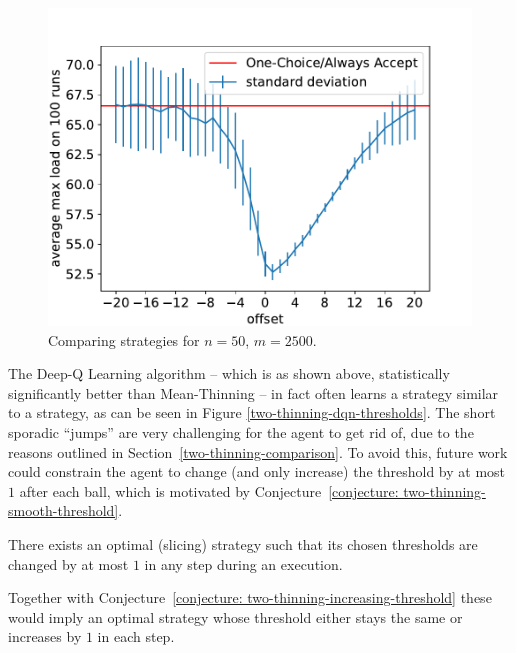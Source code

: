 \begin{figure}[h]
    \centering
    \includegraphics[scale=0.6]{Chapter4/Figs/offset_analysis_50_2500.pdf}
    \caption{Comparing \ConstantOffset strategies for $n=50$, $m=2500$.}
    \label{two-thinning-constant-offset}
\end{figure}





The Deep-Q Learning algorithm -- which is as shown above, statistically significantly better than Mean-Thinning -- in fact often learns a strategy similar to a \ConstantOffset strategy, as can be seen in Figure \ref{two-thinning-dqn-thresholds}. The short sporadic ``jumps'' are very challenging for the agent to get rid of, due to the reasons outlined in Section~\ref{two-thinning-comparison}. To avoid this, future work could constrain the agent to change (and only increase) the threshold by at most $1$ after each ball, which is motivated by Conjecture~\ref{conjecture: two-thinning-smooth-threshold}.


\begin{conjecture}\label{conjecture: two-thinning-smooth-threshold}
There exists an optimal (slicing) strategy such that its chosen thresholds are changed by at most $1$ in any step during an execution.
\end{conjecture}


\begin{remark}
Together with Conjecture~\ref{conjecture: two-thinning-increasing-threshold} these would imply an optimal strategy whose threshold either stays the same or increases by $1$ in each step.
\end{remark}


